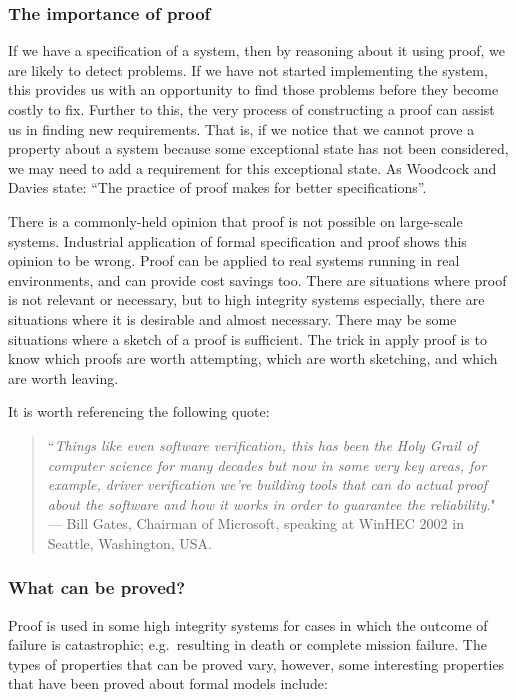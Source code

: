 \subsubsection*{The importance of proof}

If we have a specification of a system, then by reasoning about it using proof, we are likely to detect problems. If we have not started implementing the system, this provides us with an opportunity to find those problems before they become costly to fix. Further to this, the very process of constructing a proof can assist us in finding new requirements. That is, if we notice that we cannot prove a property about a system because some exceptional state has not been considered, we may need to add a requirement for this exceptional state. As Woodcock and Davies state: ``The practice of proof makes for better specifications''.

There is a commonly-held opinion that proof is not possible on large-scale systems. Industrial application of formal specification and proof shows this opinion to be wrong. Proof can be applied to real systems running in real environments, and can provide cost savings too. There are situations where proof is not relevant or necessary, but to high integrity systems especially, there are situations where it is desirable and almost necessary. There may be some situations where a sketch of a proof is sufficient. The trick in apply proof is to know which proofs are worth attempting, which are worth sketching, and which are worth leaving.

It is worth referencing the following quote:

\begin{quote}
``\emph{Things like even software verification, this has been the Holy Grail of computer science for many decades but now in some very key areas, for example, driver verification we're building tools that can do actual proof about the software and how it works in order to guarantee the reliability}." --- Bill Gates, Chairman of Microsoft, speaking at WinHEC 2002 in Seattle, Washington, USA.
\end{quote}

\subsubsection*{What can be proved?}

Proof is used in some high integrity systems for cases in which the outcome of failure is catastrophic; e.g.\ resulting in death or complete mission failure. The types of properties that can be proved vary, however, some interesting properties that have been proved about formal models include:

